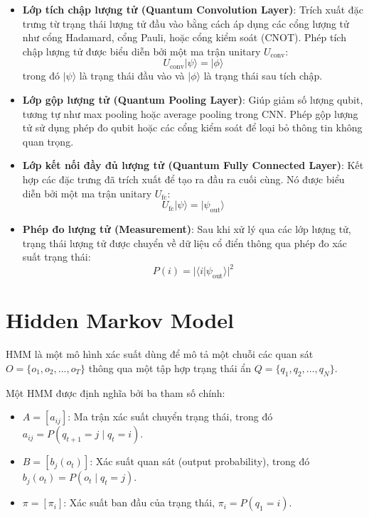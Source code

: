 \documentclass{article}
\begin{document}
\begin{itemize}
    \item \textbf{Lớp tích chập lượng tử (Quantum Convolution Layer)}: Trích xuất đặc trưng từ trạng thái lượng tử đầu vào bằng cách áp dụng các cổng lượng tử như cổng Hadamard, cổng Pauli, hoặc cổng kiểm soát (CNOT). Phép tích chập lượng tử được biểu diễn bởi một ma trận unitary $U_{\text{conv}}$:
          \begin{equation}
              U_{\text{conv}} | \psi \rangle = | \phi \rangle
          \end{equation}
          trong đó $|\psi\rangle$ là trạng thái đầu vào và $|\phi\rangle$ là trạng thái sau tích chập.

    \item \textbf{Lớp gộp lượng tử (Quantum Pooling Layer)}: Giúp giảm số lượng qubit, tương tự như max pooling hoặc average pooling trong CNN. Phép gộp lượng tử sử dụng phép đo qubit hoặc các cổng kiểm soát để loại bỏ thông tin không quan trọng.

    \item \textbf{Lớp kết nối đầy đủ lượng tử (Quantum Fully Connected Layer)}: Kết hợp các đặc trưng đã trích xuất để tạo ra đầu ra cuối cùng. Nó được biểu diễn bởi một ma trận unitary $U_{\text{fc}}$:
          \begin{equation}
              U_{\text{fc}} | \psi \rangle = | \psi_{\text{out}} \rangle
          \end{equation}

    \item \textbf{Phép đo lượng tử (Measurement)}: Sau khi xử lý qua các lớp lượng tử, trạng thái lượng tử được chuyển về dữ liệu cổ điển thông qua phép đo xác suất trạng thái:
          \begin{equation}
              P(i) = | \langle i | \psi_{\text{out}} \rangle |^2
          \end{equation}
\end{itemize}

\section{Hidden Markov Model}
HMM là một mô hình xác suất dùng để mô tả một chuỗi các quan sát $O = \{o_1, o_2, ..., o_T\}$ thông qua một tập hợp trạng thái ẩn $Q = \{q_1, q_2, ..., q_N\}$.

Một HMM được định nghĩa bởi ba tham số chính:
\begin{itemize}
    \item $A = [a_{ij}]$: Ma trận xác suất chuyển trạng thái, trong đó $a_{ij} = P(q_{t+1} = j \mid q_t = i)$.
    \item $B = [b_j(o_t)]$: Xác suất quan sát (output probability), trong đó $b_j(o_t) = P(o_t \mid q_t = j)$.
    \item $\pi = [\pi_i]$: Xác suất ban đầu của trạng thái, $\pi_i = P(q_1 = i)$.
\end{itemize}
\end{document}
